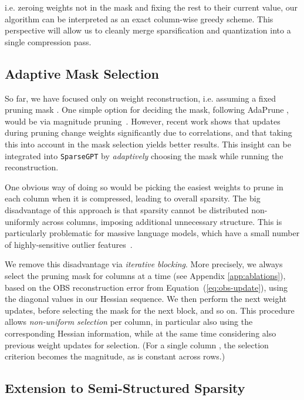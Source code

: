 \documentclass{article}
\theoremstyle{plain}
\theoremstyle{definition}
\theoremstyle{remark}
\newcommand{\sparsegpt}[1]{\texttt{SparseGPT}}
\begin{document}
i.e. zeroing weights not in the mask and fixing the rest to their current value, our algorithm can be interpreted as an exact column-wise greedy scheme. This perspective will allow us to cleanly merge sparsification and quantization into a single compression pass.

\subsection{Adaptive Mask Selection}

So far, we have focused only on weight reconstruction, i.e. assuming a fixed pruning mask . One simple option for deciding the mask, following AdaPrune \cite{hubara2021accelerated}, would be via magnitude pruning~\cite{zhu2017prune}. 
However, recent work \cite{frantar2022obc} shows that updates during pruning change weights significantly due to correlations, and that taking this into account in the mask selection yields better results. 
This insight can be integrated into \sparsegpt{} by \emph{adaptively} choosing the mask while running the reconstruction.

One obvious way of doing so would be picking the  easiest weights to prune in each column  when it is compressed, leading to  overall sparsity. 
The big disadvantage of this approach is that sparsity cannot be distributed non-uniformly across columns, imposing additional unnecessary structure. 
This is particularly problematic for massive language models, which have a small number of highly-sensitive outlier features~\cite{dettmers2022llm, xiao2022smoothquant}.

We remove this disadvantage via \textit{iterative blocking}. 
More precisely, we always select the pruning mask for  columns at a time (see Appendix \ref{app:ablations}), based on the OBS reconstruction error  from Equation~(\ref{eq:obs-update}), using the diagonal values in our Hessian sequence. 
We then perform the next  weight updates, before selecting the mask for the next block, and so on. 
This procedure allows \emph{non-uniform selection} per column, in particular also using the corresponding Hessian information, while at the same time considering also previous weight updates for selection.
(For a single column , the selection criterion becomes the magnitude, as  is constant across rows.)

\subsection{Extension to Semi-Structured Sparsity} 
\end{document}
